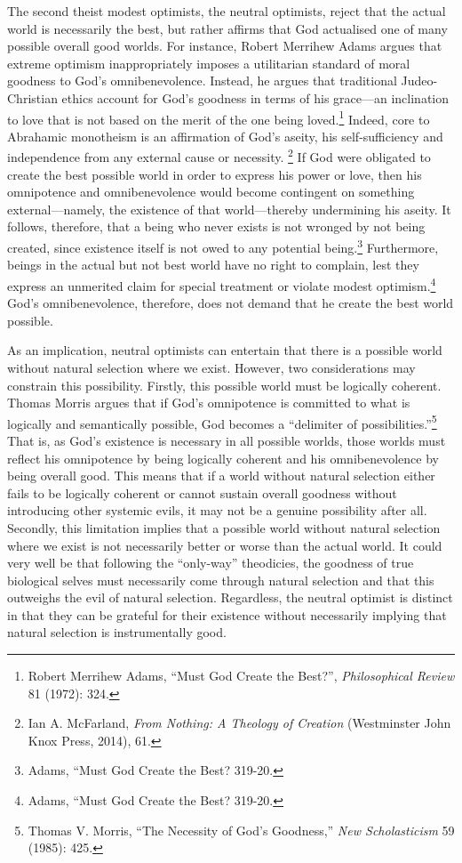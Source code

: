 The second theist modest optimists, the neutral optimists, reject that
the actual world is necessarily the best, but rather affirms that God
actualised one of many possible overall good worlds. For instance,
Robert Merrihew Adams argues that extreme optimism inappropriately
imposes a utilitarian standard of moral goodness to God's
omnibenevolence. Instead, he argues that traditional Judeo-Christian
ethics account for God's goodness in terms of his grace---an inclination
to love that is not based on the merit of the one being
loved.\footnote{Robert Merrihew Adams, ``Must God Create the Best?'',
  \emph{Philosophical Review} 81 (1972): 324.} Indeed, core to Abrahamic
monotheism is an affirmation of God's aseity, his self-sufficiency and
independence from any external cause or necessity. \footnote{Ian A.
  McFarland, \emph{From Nothing: A Theology of Creation} (Westminster
  John Knox Press, 2014), 61.} If God were obligated to create the best
possible world in order to express his power or love, then his
omnipotence and omnibenevolence would become contingent on something
external---namely, the existence of that world---thereby undermining his
aseity. It follows, therefore, that a being who never exists is not
wronged by not being created, since existence itself is not owed to any
potential being.\footnote{Adams, ``Must God Create the Best? 319-20.}
Furthermore, beings in the actual but not best world have no right to
complain, lest they express an unmerited claim for special treatment or
violate modest optimism.\footnote{Adams, ``Must God Create the Best? 319-20.} God's omnibenevolence,
therefore, does not demand that he create the best world possible.

As an implication, neutral optimists can entertain that there is a
possible world without natural selection where we exist. However, two
considerations may constrain this possibility. Firstly, this possible
world must be logically coherent. Thomas Morris argues that if God's
omnipotence is committed to what is logically and semantically possible,
God becomes a ``delimiter of possibilities.''\footnote{Thomas V. Morris,
  ``The Necessity of God's Goodness,'' \emph{New Scholasticism} 59
  (1985): 425.} That is, as God's existence is necessary in all possible
worlds, those worlds must reflect his omnipotence by being logically
coherent and his omnibenevolence by being overall good. This means that
if a world without natural selection either fails to be logically
coherent or cannot sustain overall goodness without introducing other
systemic evils, it may not be a genuine possibility after all. Secondly,
this limitation implies that a possible world without natural selection
where we exist is not necessarily better or worse than the actual world.
It could very well be that following the ``only-way'' theodicies, the
goodness of true biological selves must necessarily come through natural
selection and that this outweighs the evil of natural selection.
Regardless, the neutral optimist is distinct in that they can be
grateful for their existence without necessarily implying that natural
selection is instrumentally good.

